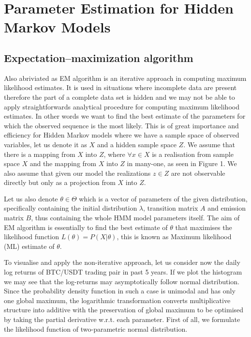 
\chapter{Parameter Estimation for Hidden Markov Models}

\ifpdf
    \graphicspath{{Chapter2/Figs/Raster/}{Chapter2/Figs/PDF/}{Chapter2/Figs/}}
\else
    \graphicspath{{Chapter2/Figs/Vector/}{Chapter2/Figs/}}
\fi



\section{ Expectation–maximization algorithm}

Also abriviated as EM algorithm is an iterative approach in computing maximum likelihood estimates. It is used in situations where incomplete data are present therefore the part of a complete data set is hidden and we may not be able to apply straightforwards analytical procedure for computing maximum likelihood estimates. In other words we want to find the best estimate of the parameters for which the observed sequence is the most likely. This is of great importance and efficiency for Hidden Markov models where we have a sample space of observed variables, let us denote it as $X$ and a hidden sample space $Z$. We assume that there is a mapping from $X$ into $Z$, where $\forall x \in X$ is a realisation from sample space $X$ and the mapping from $X$ into $Z$ in many-one, as seen in Figure 1. We also assume that given our model the realizations $z \in Z$ are not observable directly but only as a projection from $X$ into $Z$. 

Let us also denote $\theta \in \Theta$ which is a vector of parameters of the given distribution, specifically containing the initial distribution $\lambda$, transition matrix $A$ and emission matrix $B$, thus containing the whole HMM model parameters itself. The aim of EM algorithm is essentially to find the best estimate of $\theta$ that maximises the likelihood function $L(\theta) = P(X|\theta)$, this is known as Maximum likelihood (ML) estimate of $\theta$. 

To visualise and apply the non-iterative approach, let us consider now the daily log returns of BTC/USDT trading pair in past 5 years. If we plot the histogram we may see that the log-returns may asymptotically follow normal distribution. Since the probability density function in such a case is unimodal and has only one global maximum, the logarithmic transformation converts multiplicative structure into additive with the preservation of global maximum to be optimised by taking the partial derivative w.r.t. each parameter. First of all, we formulate the likelihood function of two-parametric normal distribution.
 
